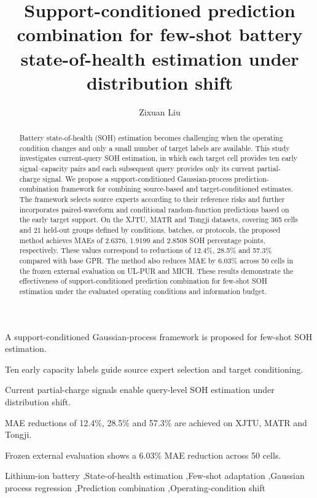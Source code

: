 \documentclass[preprint,12pt]{elsarticle}
\begin{document}
\begin{frontmatter}
\title{Support-conditioned prediction combination for few-shot battery state-of-health estimation under distribution shift}
\author[inst1]{Zixuan Liu}
\address[inst1]{Detroit Green Technology Institute, Hubei University of Technology, Wuhan 430068, China}
\begin{abstract}
  Battery state-of-health (SOH) estimation becomes challenging when the operating condition changes and only a small number of target labels are available. This study investigates current-query SOH estimation, in which each target cell provides ten early signal--capacity pairs and each subsequent query provides only its current partial-charge signal. We propose a support-conditioned Gaussian-process prediction-combination framework for combining source-based and target-conditioned estimates. The framework selects source experts according to their reference risks and further incorporates paired-waveform and conditional random-function predictions based on the early target support. On the XJTU, MATR and Tongji datasets, covering 365 cells and 21 held-out groups defined by conditions, batches, or protocols, the proposed method achieves MAEs of 2.6376, 1.9199 and 2.8508 SOH percentage points, respectively. These values correspond to reductions of 12.4\%, 28.5\% and 57.3\% compared with base GPR. The method also reduces MAE by 6.03\% across 50 cells in the frozen external evaluation on UL-PUR and MICH. These results demonstrate the effectiveness of support-conditioned prediction combination for few-shot SOH estimation under the evaluated operating conditions and information budget.
\end{abstract}
\begin{highlights}
\item A support-conditioned Gaussian-process framework is proposed for few-shot SOH estimation.
\item Ten early capacity labels guide source expert selection and target conditioning.
\item Current partial-charge signals enable query-level SOH estimation under distribution shift.
\item MAE reductions of 12.4\%, 28.5\% and 57.3\% are achieved on XJTU, MATR and Tongji.
\item Frozen external evaluation shows a 6.03\% MAE reduction across 50 cells.
\end{highlights}
\begin{keyword}
Lithium-ion battery \sep State-of-health estimation \sep Few-shot adaptation \sep Gaussian process regression \sep Prediction combination \sep Operating-condition shift
\end{keyword}
\end{frontmatter}
\end{document}
